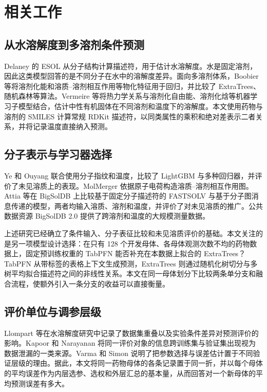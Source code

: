 \section{相关工作}
\subsection{从水溶解度到多溶剂条件预测}
Delaney 的 ESOL 从分子结构计算描述符，用于估计水溶解度\cite{delaney2004}。水是固定溶剂，因此这类模型回答的是不同分子在水中的溶解度差异。面向多溶剂体系，Boobier 等将溶剂化能和溶质--溶剂相互作用等物化特征用于回归，并比较了 ExtraTrees、随机森林等算法\cite{boobier2020}。Vermeire 等将热力学关系与溶剂化自由能、溶剂化焓等机器学习子模型结合，估计中性有机固体在不同溶剂和温度下的溶解度\cite{vermeire2022}。本文使用药物与溶剂的 SMILES 计算常规 RDKit 描述符，以同类属性的乘积和绝对差表示二者关系，并将记录温度直接纳入预测。

\subsection{分子表示与学习器选择}
Ye 和 Ouyang 联合使用分子指纹和温度，比较了 LightGBM 与多种回归器，并评价了未见溶质上的表现\cite{ye2021}。MolMerger 依据原子电荷构造溶质--溶剂相互作用图\cite{molmerger2024}。Attia 等在 BigSolDB 上比较基于固定分子描述符的 FASTSOLV 与基于分子图消息传递的模型，两者均输入溶质、溶剂和温度，并评价了对未见溶质的推广\cite{fastsolv2025}。公共数据资源 BigSolDB 2.0 提供了跨溶剂和温度的大规模测量数据\cite{bigsoldb2025}。

上述研究已经确立了条件输入、分子表征比较和未见溶质评价的基础。本文关注的是另一项模型设计选择：在只有 128 个开发母体、各母体观测次数不均的药物数据上，固定预训练权重的 TabPFN 能否补充在本数据上拟合的 ExtraTrees？TabPFN 从带标签的表格上下文生成预测\cite{tabpfn2025}，ExtraTrees 则通过随机化树切分与多树平均拟合描述符之间的非线性关系\cite{extratrees2006}。本文在同一母体划分下比较两条单分支和融合流程，使额外引入一条分支的收益可以直接衡量。

\subsection{评价单位与调参层级}
Llompart 等在水溶解度研究中记录了数据集重叠以及实验条件差异对预测评价的影响\cite{solubility2024}。Kapoor 和 Narayanan 将同一评价对象的信息跨训练集与验证集出现视为数据泄漏的一类来源\cite{leakage2023}。Varma 和 Simon 说明了把参数选择与误差估计置于不同验证层级的理由\cite{varma2006}。据此，本文将同一药物母体的各条记录置于同一折，并以每个母体的平均误差作为内层选参、选权和外层汇总的基本量，从而回答对一个新母体的平均预测误差有多大。
